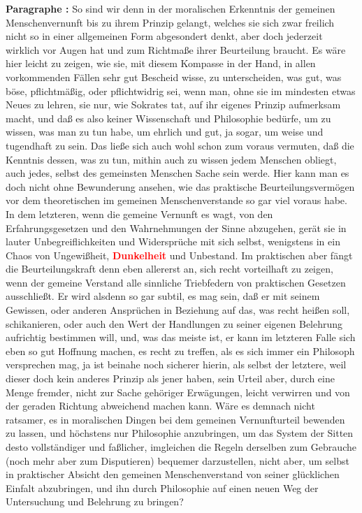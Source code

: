 \documentclass[a4paper,12pt,twoside]{book}
\newcommand{\match}[1]{\textcolor{red}{\textbf{#1}}}
\begin{document}
	\noindent\textbf{Paragraphe : }So sind wir denn in der moralischen Erkenntnis der gemeinen Menschenvernunft bis zu ihrem Prinzip gelangt, welches sie sich zwar freilich nicht so in einer allgemeinen  Form abgesondert denkt, aber doch jederzeit wirklich vor Augen hat und zum Richtmaße ihrer Beurteilung braucht. Es wäre hier leicht zu zeigen, wie sie, mit diesem Kompasse in der Hand, in allen vorkommenden Fällen sehr gut Bescheid wisse, zu unterscheiden, was gut, was böse, pflichtmäßig, oder pflichtwidrig sei, wenn man, ohne sie im mindesten etwas Neues zu lehren, sie nur, wie Sokrates tat, auf ihr eigenes Prinzip aufmerksam macht, und daß es also keiner Wissenschaft und Philosophie bedürfe, um zu wissen, was man zu tun habe, um ehrlich und gut, ja sogar, um weise und tugendhaft zu sein. Das ließe sich auch wohl schon zum voraus vermuten, daß die Kenntnis dessen, was zu tun, mithin auch zu wissen jedem Menschen obliegt, auch jedes, selbst des gemeinsten Menschen Sache sein werde. Hier kann man es doch nicht ohne Bewunderung ansehen, wie das praktische Beurteilungsvermögen vor dem theoretischen im gemeinen Menschenverstande so gar viel voraus habe. In dem letzteren, wenn die gemeine Vernunft es wagt, von den Erfahrungsgesetzen und den Wahrnehmungen der Sinne abzugehen, gerät sie in lauter Unbegreiflichkeiten und Widersprüche mit sich selbst, wenigstens in ein Chaos von Ungewißheit, \match{Dunkelheit} und Unbestand. Im praktischen aber fängt die Beurteilungskraft denn eben allererst an, sich recht vorteilhaft zu zeigen, wenn der gemeine Verstand alle sinnliche Triebfedern von praktischen Gesetzen ausschließt. Er wird alsdenn so gar subtil, es mag sein, daß er mit seinem Gewissen, oder anderen Ansprüchen in Beziehung auf das, was recht heißen soll, schikanieren, oder auch den Wert der Handlungen zu seiner eigenen Belehrung aufrichtig bestimmen will, und, was das meiste ist, er kann im letzteren Falle sich eben so gut Hoffnung machen, es recht zu treffen, als es sich immer ein Philosoph versprechen mag, ja ist beinahe noch sicherer hierin, als selbst der letztere, weil dieser doch kein anderes Prinzip als jener haben, sein Urteil aber, durch eine Menge fremder, nicht zur Sache gehöriger Erwägungen, leicht verwirren und von der geraden Richtung abweichend machen kann. Wäre es demnach nicht ratsamer,  es in moralischen Dingen bei dem gemeinen Vernunfturteil bewenden zu lassen, und höchstens nur Philosophie anzubringen, um das System der Sitten desto vollständiger und faßlicher, imgleichen die Regeln derselben zum Gebrauche (noch mehr aber zum Disputieren) bequemer darzustellen, nicht aber, um selbst in praktischer Absicht den gemeinen Menschenverstand von seiner glücklichen Einfalt abzubringen, und ihn durch Philosophie auf einen neuen Weg der Untersuchung und Belehrung zu bringen? 
	
\end{document}
